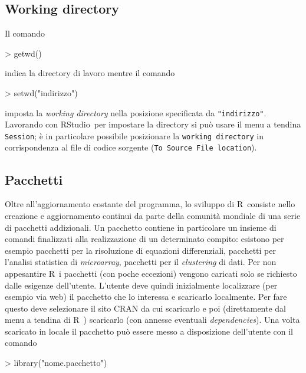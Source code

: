 \documentclass[onecolumn,11pt]{book}
\newcommand{\rst}{\textsf{RStudio}~}
\newcommand{\rpr}{\textsf{R}~}
\begin{document}
\subsection*{Working directory}
Il comando 
\begin{Schunk}
\begin{Sinput}
> getwd()
\end{Sinput}
\end{Schunk}
indica la directory di lavoro mentre il comando
\begin{Schunk}
\begin{Sinput}
> setwd("indirizzo")
\end{Sinput}
\end{Schunk}
 imposta la {\it working directory}  nella posizione specificata da \texttt{"indirizzo"}.
 Lavorando con \rst per impostare la directory si pu\`o usare il menu a tendina
\texttt{Session};  \`e  in particolare  possibile posizionare la \texttt{working directory} in corrispondenza al file di codice sorgente (\texttt{To Source File location}).


\subsection*{Pacchetti}

Oltre all'aggiornamento costante del programma, lo sviluppo di \rpr consiste nello creazione e aggiornamento continui da parte della comunit\`a  mondiale di una serie di pacchetti addizionali. Un pacchetto contiene in particolare un insieme di comandi finalizzati alla  realizzazione di un determinato compito: esistono per esempio pacchetti per la risoluzione di equazioni differenziali, pacchetti per l'analisi statistica di {\it microarray}, pacchetti per il {\it clustering} di dati.  Per non appesantire \rpr i pacchetti (con poche eccezioni) vengono caricati solo se richiesto dalle esigenze dell'utente.
L'utente deve quindi inizialmente localizzare (per esempio via web) il pacchetto che lo interessa e scaricarlo localmente.
Per fare questo deve selezionare il sito CRAN da cui scaricarlo e poi (direttamente dal menu a tendina di \rpr) scaricarlo (con annesse eventuali {\it dependencies}). Una volta scaricato in locale il pacchetto pu\`o essere messo a disposizione dell'utente con il comando
\begin{Schunk}
\begin{Sinput}
> library("nome.pacchetto")
\end{Sinput}
\end{Schunk}
\end{document}
